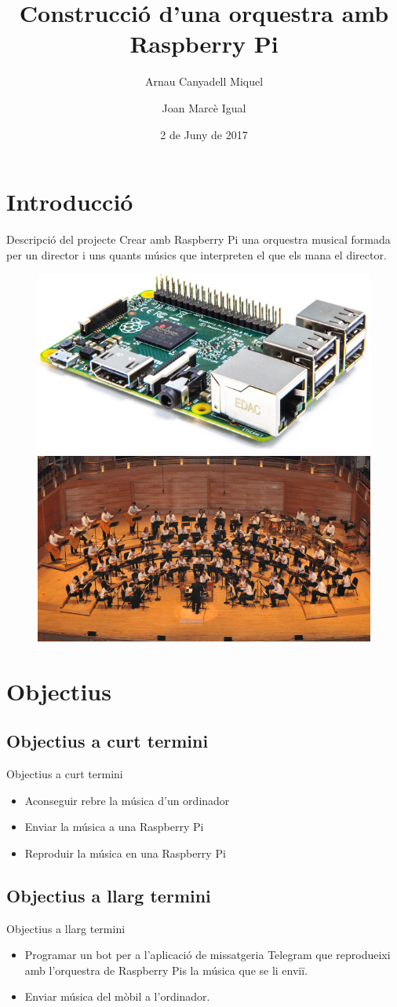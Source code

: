 \documentclass{beamer}
\title{Construcció d'una orquestra amb Raspberry Pi}
\author{Arnau Canyadell Miquel \and Joan Marcè Igual}
\date{2 de Juny de 2017}
\begin{document}
\frame{\titlepage}
\section{Introducció}
\begin{frame}{Descripció del projecte}
	Crear amb Raspberry Pi una orquestra musical formada per un director i uns quants músics que interpreten el que els mana el director.
	\begin{figure}
		\includegraphics[width=0.475\linewidth]{images/raspberry}
		\hfill
		\includegraphics[width=0.475\linewidth]{images/orchestra}
	\end{figure}
\end{frame}

\section{Objectius}
\subsection{Objectius a curt termini}
\begin{frame}{Objectius a curt termini}
	
	\begin{itemize}
		\item Aconseguir rebre la música d'un ordinador
		\item Enviar la música a una Raspberry Pi
		\item Reproduir la música en una Raspberry Pi
	\end{itemize}
\end{frame}

\subsection{Objectius a llarg termini}
\begin{frame}{Objectius a llarg termini}
	\begin{itemize}
		\item Programar un bot per a l'aplicació de missatgeria Telegram que reprodueixi amb l'orquestra de Raspberry Pis la música que se li enviï.
		\item Enviar música del mòbil a l'ordinador.
	\end{itemize}
\end{frame}
\end{document}
